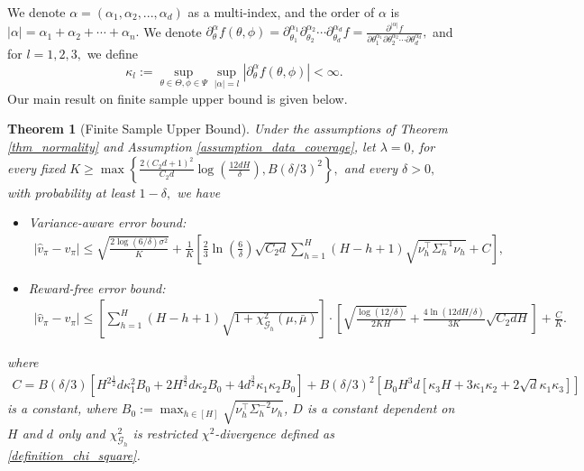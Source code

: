 \documentclass{article}
\numberwithin{equation}{section}
\theoremstyle{plain}
\newtheorem{theorem}{Theorem}[section]
\theoremstyle{definition}
\theoremstyle{remark}
\begin{document}
We denote $\alpha = (\alpha_1,\alpha_2,...,\alpha_d)$ as a multi-index, and the order of $\alpha$ is $|\alpha|=\alpha_{1}+\alpha_{2}+\cdots+\alpha_{n}.$ We denote $\partial^{\alpha}_{\theta} f(\theta,\phi) = \partial_{\theta_1}^{\alpha_{1}} \partial_{\theta_2}^{\alpha_{2}} \cdots \partial_{\theta_d}^{\alpha_{d}} f=\frac{\partial^{|\alpha|} f}{\partial \theta_{1}^{\alpha_{1}} \partial \theta_{2}^{\alpha_{2}} \cdots \partial \theta_{d}^{\alpha_{d}}},$ and for $l = 1,2,3,$ we define
\begin{equation*}
    \kappa_{l} := \sup_{\theta \in \Theta, \phi \in \Psi} \sup_{\left|\alpha\right| = l} \left| \partial^{\alpha}_{\theta} f(\theta,\phi) \right| < \infty.
\end{equation*}
Our main result on finite sample upper bound is given below.
\begin{theorem}[Finite Sample Upper Bound]\label{thm_finite_sample_square}
Under the assumptions of Theorem \ref{thm_normality} and Assumption \ref{assumption_data_coverage}, let $\lambda = 0$, for every fixed $K \geq \max\left\{\frac{2(C_2 d + 1)^2}{C_2 d}\log\left(\frac{12dH}{\delta}\right),B(\delta/3)^2\right\},$ and every $\delta > 0,$ with probability at least $1 - \delta,$ we have
\begin{itemize}
    \item[(i)] Variance-aware error bound:
    \begin{align}\label{finite_bound2}
    \left|\widehat{v}_{\pi} - v_{\pi} \right| \leq \sqrt{\frac{2 \log (6/ \delta) \sigma^2}{K}} +\frac{1}{K}\left[\frac{2}{3} \ln \left(\frac{6}{\delta}\right) \sqrt{C_{2} d} \sum_{h=1}^{H}(H-h+1) \sqrt{\nu_{h}^{\top} \Sigma_{h}^{-1} \nu_{h}} + C\right],
\end{align}
\item[(ii)] Reward-free error bound:
\begin{align}\label{finite_bound1}
    \left|\widehat{v}_{\pi} - v_{\pi} \right| \leq \left[\sum_{h=1}^{H}(H-h+1) \sqrt{1+\chi_{\mathcal{G}_{h}}^{2}(\mu, \bar{\mu})}\right] \cdot \left[\sqrt{\frac{\log (12/ \delta)}{2 K H}} + \frac{4 \ln(12dH/\delta)}{3K} \sqrt{C_{2} d H}\right] + \frac{C}{K}.
\end{align}
\end{itemize}
where
\begin{align*}
    C = B(\delta / 3)\left[H^{2 \frac{1}{2}} d \kappa_{1}^{2} B_{0}+2 H^{\frac{3}{2}} d \kappa_{2} B_{0}+4 d^{\frac{3}{2}} \kappa_{1} \kappa_{2} B_{0}\right] + B(\delta / 3)^{2}\left[B_{0} H^{3} d\left[\kappa_{3} H+3 \kappa_{1} \kappa_{2}+2 \sqrt{d} \kappa_{1} \kappa_{3}\right]\right]
\end{align*}
is a constant, where $B_{0}:=\max _{h \in[H]} \sqrt{\nu_{h}^{\top} \Sigma_{h}^{-2} \nu_{h}}$, $D$ is a constant dependent on $H$ and $d$ only and $\chi^2_{\mathcal{G}_h}$ is restricted $\chi^2$-divergence defined as \eqref{definition_chi_square}. 
\end{theorem}
\end{document}
